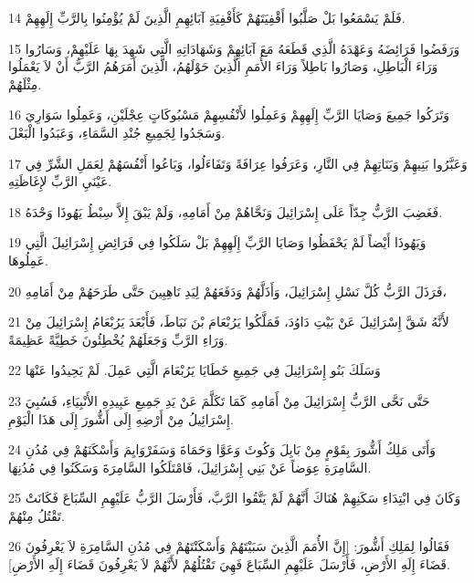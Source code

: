 \par 14 فَلَمْ يَسْمَعُوا بَلْ صَلَّبُوا أَقْفِيَتَهُمْ كَأَقْفِيَةِ آبَائِهِمِ الَّذِينَ لَمْ يُؤْمِنُوا بِالرَّبِّ إِلَهِهِمْ.
\par 15 وَرَفَضُوا فَرَائِضَهُ وَعَهْدَهُ الَّذِي قَطَعَهُ مَعَ آبَائِهِمْ وَشَهَادَاتِهِ الَّتِي شَهِدَ بِهَا عَلَيْهِمْ، وَسَارُوا وَرَاءَ الْبَاطِلِ، وَصَارُوا بَاطِلاً وَرَاءَ الأُمَمِ الَّذِينَ حَوْلَهُمُ، الَّذِينَ أَمَرَهُمُ الرَّبُّ أَنْ لاَ يَعْمَلُوا مِثْلَهُمْ.
\par 16 وَتَرَكُوا جَمِيعَ وَصَايَا الرَّبِّ إِلَهِهِمْ وَعَمِلُوا لأَنْفُسِهِمْ مَسْبُوكَاتٍ عِجْلَيْنِ، وَعَمِلُوا سَوَارِيَ وَسَجَدُوا لِجَمِيعِ جُنْدِ السَّمَاءِ، وَعَبَدُوا الْبَعْلَ.
\par 17 وَعَبَّرُوا بَنِيهِمْ وَبَنَاتِهِمْ فِي النَّارِ، وَعَرَفُوا عِرَافَةً وَتَفَاءَلُوا، وَبَاعُوا أَنْفُسَهُمْ لِعَمَلِ الشَّرِّ فِي عَيْنَيِ الرَّبِّ لإِغَاظَتِهِ.
\par 18 فَغَضِبَ الرَّبُّ جِدّاً عَلَى إِسْرَائِيلَ وَنَحَّاهُمْ مِنْ أَمَامِهِ، وَلَمْ يَبْقَ إِلاَّ سِبْطُ يَهُوذَا وَحْدَهُ.
\par 19 وَيَهُوذَا أَيْضاً لَمْ يَحْفَظُوا وَصَايَا الرَّبِّ إِلَهِهِمْ بَلْ سَلَكُوا فِي فَرَائِضِ إِسْرَائِيلَ الَّتِي عَمِلُوهَا.
\par 20 فَرَذَلَ الرَّبُّ كُلَّ نَسْلِ إِسْرَائِيلَ، وَأَذَلَّهُمْ وَدَفَعَهُمْ لِيَدِ نَاهِبِينَ حَتَّى طَرَحَهُمْ مِنْ أَمَامِهِ،
\par 21 لأَنَّهُ شَقَّ إِسْرَائِيلَ عَنْ بَيْتِ دَاوُدَ، فَمَلَّكُوا يَرُبْعَامَ بْنَ نَبَاطَ، فَأَبْعَدَ يَرُبْعَامُ إِسْرَائِيلَ مِنْ وَرَاءِ الرَّبِّ وَجَعَلَهُمْ يُخْطِئُونَ خَطِيَّةً عَظِيمَةً.
\par 22 وَسَلَكَ بَنُو إِسْرَائِيلَ فِي جَمِيعِ خَطَايَا يَرُبْعَامَ الَّتِي عَمِلَ. لَمْ يَحِيدُوا عَنْهَا
\par 23 حَتَّى نَحَّى الرَّبُّ إِسْرَائِيلَ مِنْ أَمَامِهِ كَمَا تَكَلَّمَ عَنْ يَدِ جَمِيعِ عَبِيدِهِ الأَنْبِيَاءِ، فَسُبِيَ إِسْرَائِيلُ مِنْ أَرْضِهِ إِلَى أَشُّورَ إِلَى هَذَا الْيَوْمِ.
\par 24 وَأَتَى مَلِكُ أَشُّورَ بِقَوْمٍ مِنْ بَابِلَ وَكُوثَ وَعَوَّا وَحَمَاةَ وَسَفَرْوَايِمَ وَأَسْكَنَهُمْ فِي مُدُنِ السَّامِرَةِ عِوَضاً عَنْ بَنِي إِسْرَائِيلَ، فَامْتَلَكُوا السَّامِرَةَ وَسَكَنُوا فِي مُدُنِهَا.
\par 25 وَكَانَ فِي ابْتِدَاءِ سَكَنِهِمْ هُنَاكَ أَنَّهُمْ لَمْ يَتَّقُوا الرَّبَّ، فَأَرْسَلَ الرَّبُّ عَلَيْهِمِ السِّبَاعَ فَكَانَتْ تَقْتُلُ مِنْهُمْ.
\par 26 فَقَالُوا لِمَلِكِ أَشُّورَ: [إِنَّ الأُمَمَ الَّذِينَ سَبَيْتَهُمْ وَأَسْكَنْتَهُمْ فِي مُدُنِ السَّامِرَةِ لاَ يَعْرِفُونَ قَضَاءَ إِلَهِ الأَرْضِ، فَأَرْسَلَ عَلَيْهِمِ السِّبَاعَ فَهِيَ تَقْتُلُهُمْ لأَنَّهُمْ لاَ يَعْرِفُونَ قَضَاءَ إِلَهِ الأَرْضِ].
